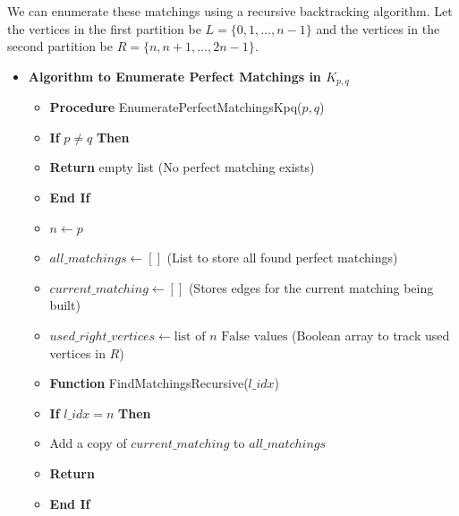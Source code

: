 \documentclass{article}
\begin{document}
We can enumerate these matchings using a recursive backtracking algorithm. Let the vertices in the first partition be $L = \{0, 1, \dots, n-1\}$ and the vertices in the second partition be $R = \{n, n+1, \dots, 2n-1\}$.

\begin{itemize}
    \item \textbf{Algorithm to Enumerate Perfect Matchings in $K_{p,q}$}

    \begin{itemize}
        \item \textbf{Procedure} EnumeratePerfectMatchingsKpq($p, q$)
        \item \hspace{0.5cm} \textbf{If} $p \neq q$ \textbf{Then}
        \item \hspace{1cm} \textbf{Return} empty list (No perfect matching exists)
        \item \hspace{0.5cm} \textbf{End If}
        \item \hspace{0.5cm} $n \gets p$
        \item \hspace{0.5cm} $all\_matchings \gets []$ (List to store all found perfect matchings)
        \item \hspace{0.5cm} $current\_matching \gets []$ (Stores edges for the current matching being built)
        \item \hspace{0.5cm} $used\_right\_vertices \gets \text{list of } n \text{ False values}$ (Boolean array to track used vertices in $R$)
        
        \item \hspace{0.5cm} \textbf{Function} FindMatchingsRecursive($l\_idx$)
        \item \hspace{1cm} \textbf{If} $l\_idx = n$ \textbf{Then}
        \item \hspace{1.5cm} Add a copy of $current\_matching$ to $all\_matchings$
        \item \hspace{1.5cm} \textbf{Return}
        \item \hspace{1cm} \textbf{End If}
        

\end{itemize}
\end{itemize}
\end{document}
